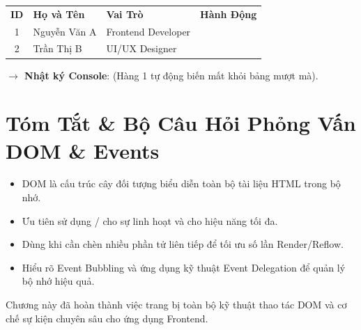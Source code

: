 \begin{browserWindow}
\sffamily\small
\begin{tabularx}{\linewidth}{c Z K{3cm} c}
\textbf{ID} & \textbf{Họ và Tên} & \textbf{Vai Trò} & \textbf{Hành Động} \\
1 & Nguyễn Văn A & Frontend Developer &  \\
2 & Trần Thị B & UI/UX Designer &  \\
\end{tabularx}

\vspace{6pt}
\textbf{$\rightarrow$ Nhật ký Console}:  (Hàng 1 tự động biến mất khỏi bảng mượt mà).
\end{browserWindow}

\section{Tóm Tắt \& Bộ Câu Hỏi Phỏng Vấn DOM \& Events}

\begin{itemize}[leftmargin=1.5em, itemsep=4pt]
    \item DOM là cấu trúc cây đối tượng biểu diễn toàn bộ tài liệu HTML trong bộ nhớ.
    \item Ưu tiên sử dụng  /  cho sự linh hoạt và  cho hiệu năng tối đa.
    \item Dùng  khi cần chèn nhiều phần tử liên tiếp để tối ưu số lần Render/Reflow.
    \item Hiểu rõ Event Bubbling và ứng dụng kỹ thuật Event Delegation để quản lý bộ nhớ hiệu quả.
\end{itemize}

Chương này đã hoàn thành việc trang bị toàn bộ kỹ thuật thao tác DOM và cơ chế sự kiện chuyên sâu cho ứng dụng Frontend.

